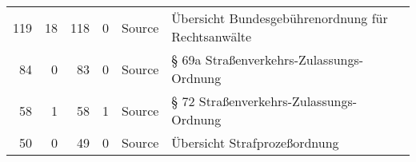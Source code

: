 \begin{tabular}{rrrrlp{}p{}}
   119 &      18 &          118 &            0 & Source          & Übersicht Bundesgebührenordnung für Rechtsanwälte                                    &                        \\
    84 &       0 &           83 &            0 & Source          & § 69a Straßenverkehrs-Zulassungs-Ordnung                                             &                        \\
    58 &       1 &           58 &            1 & Source          & § 72 Straßenverkehrs-Zulassungs-Ordnung                                              &                        \\
    50 &       0 &           49 &            0 & Source          & Übersicht Strafprozeßordnung                                                         &                        \\
\hline
\end{tabular}